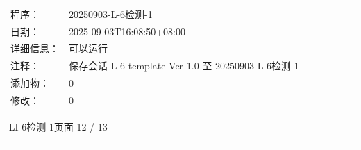 \documentclass[UTF8,10pt,a4paper,fontset=fandol]{ctexart}
\newcommand{\fieldvalue}[1]{#1}
\begin{document}
\begin{tabular}{@{}ll@{}}
程序：&
\fieldvalue{20250903-L-6检测-1}\\
日期：&
\fieldvalue{2025-09-03T16:08:50+08:00}\\
详细信息：&
\fieldvalue{可以运行}\\
注释：&
\fieldvalue{保存会话 L-6 template Ver 1.0 至 20250903-L-6检测-1}\\
添加物：&
\fieldvalue{0}\\
修改：&
\fieldvalue{0}
\end{tabular}

\newpage

-LI-6检测-1\hfill 页面 12 / 13

\vspace{0.3em}
\hrule
\vspace{0.8em}
\end{document}
